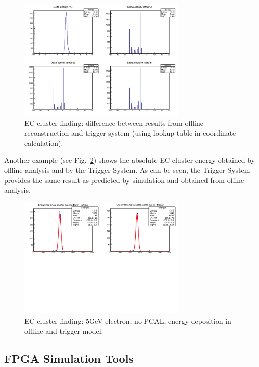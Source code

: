\begin{figure}[htp]
	\begin{center}
		\centering
		\includegraphics[width=8cm]{img/ecal_sim2.png}
		\caption{EC cluster finding: difference between results from offline reconstruction and trigger system (using lookup table in coordinate calculation).}
		\label{fig:ecal_sim2}
	\end{center}
\end{figure} 

Another example (see Fig.~\ref{fig:ecal_sim3}) shows the absolute EC cluster energy obtained by offline analysis and by the Trigger System. As can be seen, the Trigger System provides the same result as predicted by simulation and obtained from offlne analysis.

\begin{figure}[htp]
	\begin{center}
		\centering
		\includegraphics[width=8cm]{img/ecal_sim3.png}
		\caption{EC cluster finding: 5GeV electron, no PCAL, energy deposition in offline and trigger model.}
		\label{fig:ecal_sim3}
	\end{center}
\end{figure} 


\subsection{FPGA Simulation Tools}

